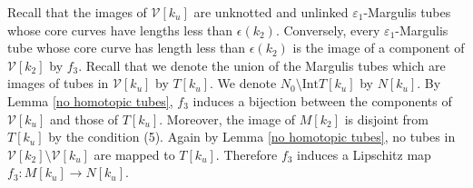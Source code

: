 \documentclass{amsart}
\theoremstyle{definition}
\numberwithin{figure}{section}
\numberwithin{equation}{section}
\def\cv{\mathcal{V}}
\def\Int{\mathrm{Int}}
\begin{document}
Recall that  the images of $\cv[k_u]$ are unknotted and unlinked $\varepsilon_1$-Margulis tubes whose core curves have lengths less than $\epsilon(k_2)$.
Conversely, every $\varepsilon_1$-Margulis tube whose core curve has length less than $\epsilon(k_2)$ is the image of a component of $\cv[k_2]$ by $f_3$.
Recall that we denote the union of the  Margulis tubes which are images of tubes in $\cv[k_u]$ by $T[k_u]$.
We denote $N_0 \setminus \Int T[k_u]$ by $N[k_u]$.
By Lemma \ref{no homotopic tubes}, $f_3$ induces a bijection between the components of $\cv[k_u]$ and those of $T[k_u]$.
Moreover, the image of $M[k_2]$ is disjoint from $T[k_u]$ by the condition (5).
Again by Lemma \ref{no homotopic tubes}, no tubes in $\cv[k_2] \setminus \cv[k_u]$ are mapped to $T[k_u]$.
Therefore $f_3$ induces a Lipschitz map $f_3: M[k_u] \rightarrow N[k_u]$.
\end{document}
